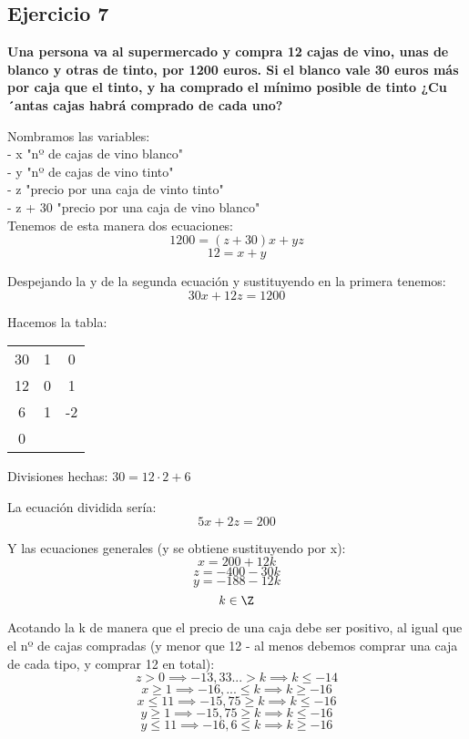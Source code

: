 \documentclass[11pt, a4paper, titlepage]{article}
\begin{document}
\subsection{\LARGE{Ejercicio 7}}

\textbf{Una persona va al supermercado y compra 12 cajas de vino, unas de
blanco y otras de tinto, por 1200 euros. Si el blanco vale 30 euros más por caja que
el tinto, y ha comprado el mínimo posible de tinto ¿Cu´antas cajas habrá comprado
de cada uno?}

Nombramos las variables: \\
- x \equiv "nº de cajas de vino blanco" \\
- y \equiv "nº de cajas de vino tinto" \\
- z \equiv "precio por una caja de vinto tinto" \\
- z + 30 \equiv "precio por una caja de vino blanco" \\

Tenemos de esta manera dos ecuaciones:
$$ 1200 = (z + 30)x + yz $$
$$ 12 = x + y $$

Despejando la y de la segunda ecuación y sustituyendo en la primera tenemos:
$$ 30x + 12z = 1200 $$

Hacemos la tabla:

\begin{center}
\begin{tabular}{c|cc}
30 & 1 & 0 \\
12 & 0 & 1 \\
\hline
6 & 1 & -2 \\
\hline
0
\end{tabular}
\end{center}

Divisiones hechas: $ 30 = 12 \cdot 2 + 6 $

La ecuación dividida sería:
$$ 5x + 2z = 200 $$

Y las ecuaciones generales (y se obtiene sustituyendo por x):
$$ x = 200 + 12k $$
$$ z = -400 - 30k $$
$$ y = -188 - 12k $$
$$ k \in \Z $$

Acotando la k de manera que el precio de una caja debe ser positivo, al igual que el nº de cajas compradas (y menor que 12 - al menos debemos comprar una caja de cada tipo, y comprar 12 en total):
$$ z > 0 \implies -13,33... > k \implies k \leq -14 $$
$$ x \geq 1 \implies -16,... \leq k \implies k \geq -16 $$
$$ x \leq 11 \implies -15,75 \geq k \implies k \leq -16 $$
$$ y \geq 1 \implies -15,75 \geq k \implies k \leq -16 $$
$$ y \leq 11 \implies -16,6 \leq k \implies k \geq -16 $$
\end{document}
